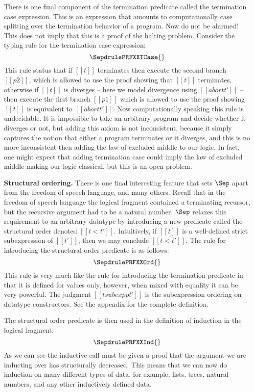 There is one final component of the termination predicate called the
termination case expression.  This is an expression that amounts to
computationally case splitting over the termination behavior of a
program.  Now do not be alarmed!  This does not imply that this is a
proof of the halting problem.  Consider the typing rule for the
termination case expression: \[ \SepdrulePRFXXTCase{} \] This rule
status that if $[[t]]$ terminates then execute the second branch
$[[p2]]$, which is allowed to use the proof showing that $[[t]]$
terminates, otherwise if $[[t]]$ is diverges -- here we model
divergence using $[[abort t']]$ -- then execute the first branch
$[[p1]]$ which is allowed to use the proof showing $[[t]]$ is
equivalent to $[[abort t']]$.  Now computationally speaking this rule
is undecidable.  It is impossible to take an arbitrary program and
decide whether it diverges or not, but adding this axiom is not
inconsistent, because it simply captures the notion that either a
program terminates or it diverges, and this is no more inconsistent
then adding the law-of-excluded middle to our logic.  In fact, one
might expect that adding termination case could imply the
law of excluded middle
making our logic classical, but this is an open problem.

\textbf{Structural ordering.}  There is one final interesting feature
that sets $\Sep$ apart from the freedom of speech language, and many
others.  Recall that in the freedom of speech language the logical
fragment contained a terminating recursor, but the recursive argument
had to be a natural number.  $\Sep$ relaxes this requirement to an
arbitrary datatype by introducing a new predicate called the
structural order denoted $[[t < t']]$.  Intuitively, if $[[t]]$ is a
well-defined strict subexpression of $[[t']]$, then we may conclude
$[[t < t']]$.  The rule for introducing the structural order predicate
is as follows: \[ \SepdrulePRFXXOrd{} \] This rule is very much like
the rule for introducing the termination predicate in that it is
defined for values only, however, when mixed with equality it can be
very powerful.  The judgment $[[t subexpp t']]$ is the subexpression
ordering on datatype constructors.  See the appendix for the complete
definition.

The structural order predicate is then used in the definition of
induction in the logical fragment: \[ \SepdrulePRFXXInd{} \] As we can
see the inductive call must be given a proof that the argument we are
inducting over has structurally decreased.  This means that we can now
do induction on many different types of data, for example, lists,
trees, natural numbers, and any other inductively defined data.

